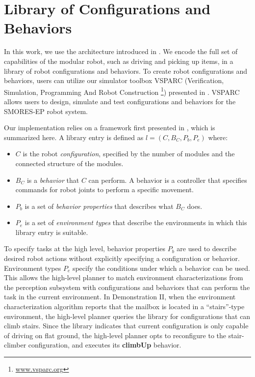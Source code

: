 \documentclass[12pt]{article}
\begin{document}
%
\section{Library of Configurations and Behaviors}
\label{sec:configuration-specifics-supplement}
%
In this work, we use the architecture introduced in \cite{Jing2016}. We encode the full set of capabilities of the modular robot, such as driving and picking up items, in a library of robot configurations and behaviors.
To create robot configurations and behaviors, users can utilize our simulator toolbox VSPARC (Verification, Simulation, Programming And Robot Construction \footnote{\url{www.vsparc.org}}) presented in \cite{Jing2016}.
VSPARC allows users to design, simulate and test configurations and behaviors for the SMORES-EP robot system.

Our implementation relies on a framework first presented in \cite{Jing2016}, which is summarized here.
A library entry is defined as $l = (C,B_C,P_b,P_e)$ where:
\begin{itemize}
\item $C$ is the robot \emph{configuration}, specified by the number of modules and the connected structure of the modules.
\item $B_C$ is a \emph{behavior} that $C$ can perform. A behavior is a controller that specifies commands for robot joints to perform a specific movement. 
\item $P_b$ is a set of \emph{behavior properties} that describes what $B_C$ does. 
\item $P_e$ is a set of \emph{environment types} that describe the environments in which this library entry is suitable. 
\end{itemize} 
%
To specify tasks at the high level, behavior properties $P_b$ are used to describe desired robot actions without explicitly specifying a configuration or behavior.
Environment types $P_e$ specify the conditions under which a behavior can be used.
This allows the high-level planner to match environment characterizations from the perception subsystem with configurations and behaviors that can perform the task in the current environment. 
In Demonstration II, when the environment characterization algorithm reports that the mailbox is located in a ``stairs''-type environment, the high-level planner queries the library for configurations that can climb stairs.  
Since the library indicates that current configuration is only capable of driving on flat ground, the high-level planner opts to reconfigure to the stair-climber configuration, and executes its \textbf{climbUp} behavior.
\end{document}
